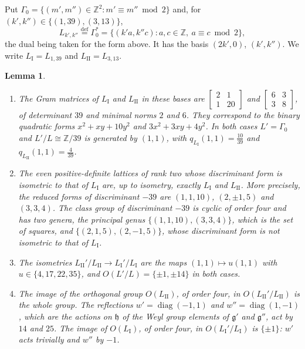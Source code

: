 \documentclass[leqno]{article}
\newcommand{\Z}{\ensuremath{\mathbb{Z}}}
\newcommand{\ov}{\overset}
\newtheorem{lemma}[thm]{Lemma}
\numberwithin{equation}{section}
\begin{document}
Put $\Gamma_0 = \{(m',m'') \in \Z^2 : m' \equiv m'' \bmod 2\}$ and, for $(k',k'') \in \{(1,39),(3,13)\}$,
\[
L_{k',k''} \ov{\mathrm{def}}{=} \Gamma_0^* = \{(k'a,k''c) : a, c \in \Z,\ a \equiv c \bmod 2\},
\]
the dual being taken for the form above. It has the basis $(2k',0)$, $(k',k'')$. We write $L_{\mathrm I} = L_{1,39}$ and $L_{\mathrm{II}} = L_{3,13}$.

\begin{lemma}
\label{lem:two-lattices}
\begin{enumerate}
\item The Gram matrices of $L_{\mathrm I}$ and $L_{\mathrm{II}}$ in these bases are $\left[\begin{smallmatrix}2&1\\1&20\end{smallmatrix}\right]$ and $\left[\begin{smallmatrix}6&3\\3&8\end{smallmatrix}\right]$, of determinant $39$ and minimal norms $2$ and $6$. They correspond to the binary quadratic forms $x^2+xy+10y^2$ and $3x^2+3xy+4y^2$. In both cases $L' = \Gamma_0$ and $L'/L \cong \Z/39$ is generated by $(1,1)$, with $q_{L_{\mathrm I}}(1,1) = \frac{10}{39}$ and $q_{L_{\mathrm{II}}}(1,1) = \frac4{39}$.
\item The even positive-definite lattices of rank two whose discriminant form is isometric to that of $L_{\mathrm I}$ are, up to isometry, exactly $L_{\mathrm I}$ and $L_{\mathrm{II}}$. More precisely, the reduced forms of discriminant $-39$ are $(1,1,10)$, $(2,\pm1,5)$ and $(3,3,4)$. The class group of discriminant $-39$ is cyclic of order four and has two genera, the principal genus $\{(1,1,10),(3,3,4)\}$, which is the set of squares, and $\{(2,1,5),(2,-1,5)\}$, whose discriminant form is not isometric to that of $L_{\mathrm I}$.
\item The isometries $L_{\mathrm{II}}'/L_{\mathrm{II}} \to L_{\mathrm I}'/L_{\mathrm I}$ are the maps $(1,1) \mapsto u(1,1)$ with $u \in \{4,17,22,35\}$, and $O(L'/L) = \{\pm1,\pm14\}$ in both cases.
\item The image of the orthogonal group $O(L_{\mathrm{II}})$, of order four, in $O(L_{\mathrm{II}}'/L_{\mathrm{II}})$ is the whole group. The reflections $w' = \operatorname{diag}(-1,1)$ and $w'' = \operatorname{diag}(1,-1)$, which are the actions on $\mathfrak h$ of the Weyl group elements of $\mathfrak g'$ and $\mathfrak g''$, act by $14$ and $25$. The image of $O(L_{\mathrm I})$, of order four, in $O(L_{\mathrm I}'/L_{\mathrm I})$ is $\{\pm1\}$: $w'$ acts trivially and $w''$ by $-1$.
\end{enumerate}
\end{lemma}
\end{document}
